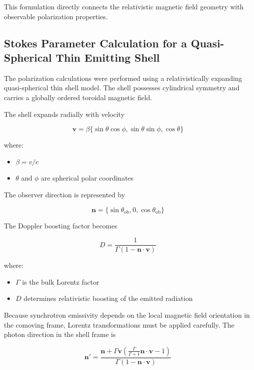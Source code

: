\documentclass{article}
\begin{document}
This formulation directly connects the relativistic magnetic field geometry with observable polarization properties.

\subsection{Stokes Parameter Calculation for a Quasi-Spherical Thin Emitting Shell}

The polarization calculations were performed using a relativistically expanding quasi-spherical thin shell model. The shell possesses cylindrical symmetry and carries a globally ordered toroidal magnetic field.

The shell expands radially with velocity

\begin{equation}
\mathbf{v} = \beta \{\sin\theta \cos\phi,\sin\theta \sin\phi,\cos\theta\}
\end{equation}

where:
\begin{itemize}
    \item \(\beta = v/c\)
    \item \(\theta\) and \(\phi\) are spherical polar coordinates
\end{itemize}

The observer direction is represented by

\begin{equation}
\mathbf{n} = \{\sin\theta_{\mathrm{ob}},0,\cos\theta_{\mathrm{ob}}\}
\end{equation}

The Doppler boosting factor becomes

\begin{equation}
D = \frac{1}{\Gamma(1-\mathbf{n}\cdot\mathbf{v})}
\end{equation}

where:
\begin{itemize}
    \item \(\Gamma\) is the bulk Lorentz factor
    \item \(D\) determines relativistic boosting of the emitted radiation
\end{itemize}

Because synchrotron emissivity depends on the local magnetic field orientation in the comoving frame, Lorentz transformations must be applied carefully. The photon direction in the shell frame is

\begin{equation}
\mathbf{n}' =
\frac{
\mathbf{n}
+\Gamma \mathbf{v}
\left(
\frac{\Gamma}{\Gamma+1}\mathbf{n}\cdot\mathbf{v}-1
\right)
}{
\Gamma(1-\mathbf{n}\cdot\mathbf{v})
}
\end{equation}
\end{document}

